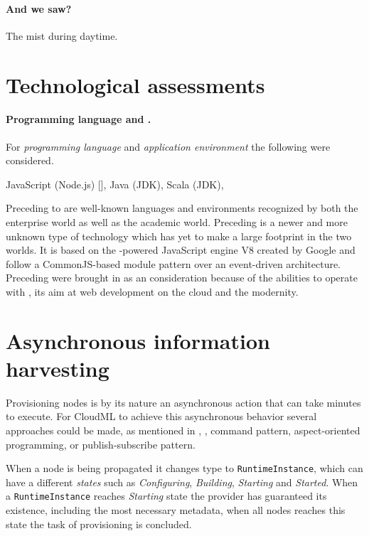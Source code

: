 \paragraph{And we saw?}

The mist during daytime.



\section{Technological assessments}

\paragraph{Programming language and .}

For \emph{programming language} and \emph{application environment} the following were considered.
\begin{ii}
  \iitem JavaScript (Node.js) [],
  \iitem Java (JDK),
  \iitem Scala (JDK),
\end{ii}
Preceding  to  are well-known languages and environments recognized by both the enterprise world as well as the academic world.
Preceding  is a newer and more unknown type of technology which has yet to 
make a large footprint in the two worlds. 
It is based on the -powered JavaScript engine V8 created by Google and follow a 
CommonJS-based module pattern over an event-driven architecture.
Preceding  were brought in as an consideration because of the abilities to operate
with , its aim at web development on the cloud and the modernity.

\section{Asynchronous information harvesting}

Provisioning nodes is by its nature an asynchronous action that can take minutes to execute.
For CloudML to achieve this asynchronous behavior several approaches could be made,
as mentioned in , \eg, command pattern, aspect-oriented programming,
or publish-subscribe pattern.

When a node is being propagated it changes type to \texttt{RuntimeInstance}, 
which can have a different \emph{states} such as \emph{Configuring}, \emph{Building}, \emph{Starting} and \emph{Started}.
When a \texttt{RuntimeInstance} reaches \emph{Starting} state the provider has guaranteed its existence, including
the most necessary metadata, when all nodes reaches this state the task of provisioning is concluded.

